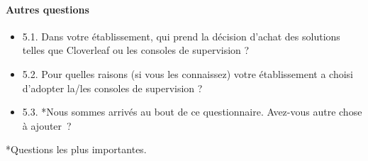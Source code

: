 	\paragraph{Autres questions}
	\begin{itemize}
	  \item 5.1. Dans votre établissement, qui prend la décision d’achat des
	  solutions telles que Cloverleaf ou les consoles de supervision ?
	  \item 5.2. Pour quelles raisons (si vous les connaissez) votre établissement a
	  choisi d’adopter la/les consoles de supervision ?
	  \item 5.3. *Nous sommes arrivés au bout de ce questionnaire. Avez-vous autre
	  chose à ajouter~?
	\end{itemize}
	
	*Questions les plus importantes.
